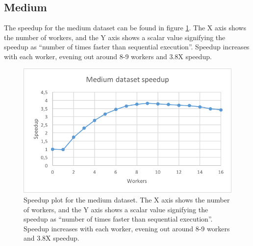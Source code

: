 \subsection{Medium}
The speedup for the medium dataset can be found in figure \ref{fig:dataset_3_speedup}.
The X axis shows the number of workers, and the Y axis shows a scalar value signifying the speedup as
``number of times faster than sequential execution''. Speedup increases with each worker, evening out around 8-9 workers and 3.8X speedup.
\begin{figure}[ht]
  \centering
  \includegraphics[width=120mm]{figures/dataset_3/dataset_3_speedup.png}
  \caption[Speedup plot for the medium dataset.]{Speedup plot for the medium dataset. The X axis shows the number of workers, and the Y axis shows a scalar value signifying the speedup as
  ``number of times faster than sequential execution''. Speedup increases with each worker, evening out around 8-9 workers and 3.8X speedup.}
  \label{fig:dataset_3_speedup}
\end{figure}

